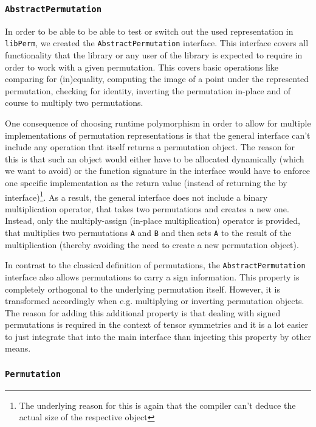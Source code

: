 \documentclass[parskip=half]{scrartcl}
\newcommand{\code}[1]{\texttt{#1}}
\newcommand{\class}[1]{\code{#1}}
\newcommand{\libPerm}{\code{libPerm}}
\begin{document}
	\subsubsection{\class{AbstractPermutation}}

	In order to be able to be able to test or switch out the used representation in \libPerm, we created the \class{AbstractPermutation} interface.
	This interface covers all functionality that the library or any user of the library is expected to require in order to work with a given
	permutation. This covers basic operations like comparing for (in)equality, computing the image of a point under the represented permutation,
	checking for identity, inverting the permutation in-place and of course to multiply two permutations.

	One consequence of choosing runtime polymorphism in order to allow for multiple implementations of permutation representations is that the general
	interface can't include any operation that itself returns a permutation object. The reason for this is that such an object would either have to be
	allocated dynamically (which we want to avoid) or the function signature in the interface would have to enforce one specific implementation as the
	return value (instead of returning the by interface)\footnote{The underlying reason for this is again that the compiler can't deduce the actual
	size of the respective object}. As a result, the general interface does not include a binary multiplication operator, that takes two permutations
	and creates a new one. Instead, only the multiply-assign (in-place multiplication) operator is provided, that multiplies two permutations \code{A}
	and \code{B} and then sets \code{A} to the result of the multiplication (thereby avoiding the need to create a new permutation object).

	In contrast to the classical definition of permutations, the \class{AbstractPermutation} interface also allows permutations to carry a sign
	information. This property is completely orthogonal to the underlying permutation itself. However, it is transformed accordingly when e.g.
	multiplying or inverting permutation objects. The reason for adding this additional property is that dealing with signed permutations is required
	in the context of tensor symmetries and it is a lot easier to just integrate that into the main interface than injecting this property by other
	means.


	\subsubsection{\class{Permutation}}
\end{document}
